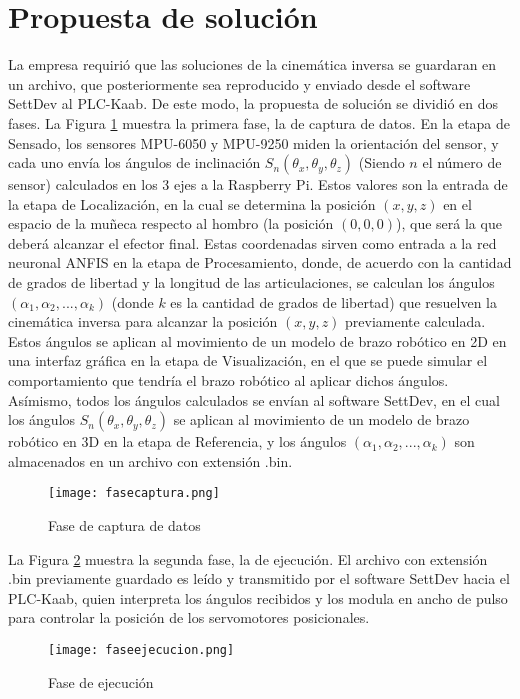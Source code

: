 \section{Propuesta de solución}

La empresa requirió que las soluciones de la cinemática inversa se guardaran en un archivo, que posteriormente sea reproducido y enviado desde el software SettDev al PLC-Kaab. De este modo, la propuesta de solución se dividió en dos fases. La Figura \ref{fig:fasecaptura} muestra la primera fase, la de captura de datos. En la etapa de Sensado, los sensores MPU-6050 y MPU-9250 miden la orientación del sensor, y cada uno envía los ángulos de inclinación $S_n(\theta_x, \theta_y, \theta_z)$ (Siendo $n$ el número de sensor) calculados en los 3 ejes a la Raspberry Pi. Estos valores son la entrada de la etapa de Localización, en la cual se determina la posición $(x, y, z)$ en el espacio de la muñeca respecto al hombro (la posición $(0, 0, 0)$), que será la que deberá alcanzar el efector final. Estas coordenadas sirven como entrada a la red neuronal ANFIS en la etapa de Procesamiento, donde, de acuerdo con la cantidad de grados de libertad y la longitud de las articulaciones, se calculan los ángulos $(\alpha_1, \alpha_2, ..., \alpha_k)$ (donde $k$ es la cantidad de grados de libertad) que resuelven la cinemática inversa para alcanzar la posición $(x, y, z)$ previamente calculada. Estos ángulos se aplican al movimiento de un modelo de brazo robótico en 2D en una interfaz gráfica en la etapa de Visualización, en el que se puede simular el comportamiento que tendría el brazo robótico al aplicar dichos ángulos. Asímismo, todos los ángulos calculados se envían al software SettDev, en el cual los ángulos $S_n(\theta_x, \theta_y, \theta_z)$ se aplican al movimiento de un modelo de brazo robótico en 3D en la etapa de Referencia, y los ángulos $(\alpha_1, \alpha_2, ..., \alpha_k)$ son almacenados en un archivo con extensión .bin.

\begin{figure}[htb]
	\centering
	\texttt{[image: fasecaptura.png]}
	\caption{Fase de captura de datos}
	\label{fig:fasecaptura}
\end{figure}

\newpage
La Figura \ref{fig:faseejecucion} muestra la segunda fase, la de ejecución. El archivo con extensión .bin previamente guardado es leído y transmitido por el software SettDev hacia el PLC-Kaab, quien interpreta los ángulos recibidos y los modula en ancho de pulso para controlar la posición de los servomotores posicionales.

\begin{figure}[htb]
	\centering
	\texttt{[image: faseejecucion.png]}
	\caption{Fase de ejecución}
	\label{fig:faseejecucion}
\end{figure}